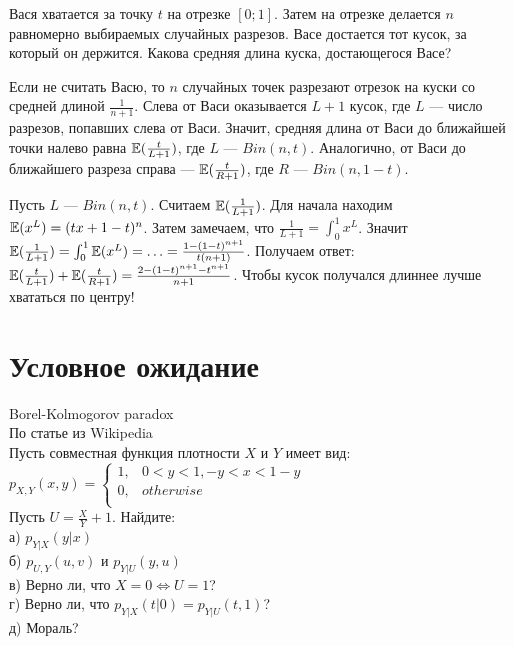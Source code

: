 \begin{problem}
Вася хватается за точку $t$ на отрезке $[0;1]$. Затем на отрезке делается $n$ равномерно выбираемых случайных разрезов.
Васе достается тот кусок, за который он держится. Какова средняя длина куска, достающегося Васе?
\end{problem} 
\begin{solution} 

Если не считать Васю, то $n$ случайных точек разрезают отрезок на куски со средней длиной $\frac{1}{n+1}$.
Слева от Васи оказывается $L+1$ кусок, где $L$ --- число разрезов, попавших слева от Васи. Значит, средняя длина от Васи до ближайшей точки налево равна
$\mathbb{E}(\frac{t}{L+1})$, где $L$ --- $Bin(n,t)$. Аналогично, от Васи до ближайшего разреза справа --- $\mathbb{E}(\frac{t}{R+1})$, где $R$ --- $Bin(n,1-t)$.

Пусть $L$ --- $Bin(n,t)$. Считаем $\mathbb{E}(\frac{1}{L+1})$. Для начала находим $\mathbb{E}(x^{L})=(tx+1-t)^{n}$.
Затем замечаем, что $\frac{1}{L+1}=\int_{0}^{1}x^{L}$. Значит $\mathbb{E}(\frac{1}{L+1})=\int_{0}^{1}\mathbb{E}(x^{L})=\ldots=\frac{1-(1-t)^{n+1}}{t(n+1)}$.
Получаем ответ: $\mathbb{E}(\frac{t}{L+1})+\mathbb{E}(\frac{t}{R+1})=\frac{2-(1-t)^{n+1}-t^{n+1}}{n+1}$.
Чтобы кусок получался длиннее лучше хвататься по центру!
\end{solution}




\section{Условное ожидание} 

\begin{problem}
 Borel-Kolmogorov paradox \\
По статье из Wikipedia \\
Пусть совместная функция плотности $X$ и $Y$ имеет вид: \\
$p_{X,Y}(x,y)=
\begin{cases}
  1, & 0<y<1, -y<x<1-y \\
  0, & otherwise \\
\end{cases}$ \\
Пусть $U=\frac{X}{Y}+1$. Найдите: \\
а) $p_{Y|X}(y|x)$ \\
б) $p_{U,Y}(u,v)$ и $p_{Y|U}(y,u)$ \\
в) Верно ли, что $X=0 \Leftrightarrow U=1$? \\
г) Верно ли, что $p_{Y|X}(t|0)=p_{Y|U}(t,1)$? \\
д) Мораль? 
\end{problem} 
\begin{solution} 

\end{solution}

